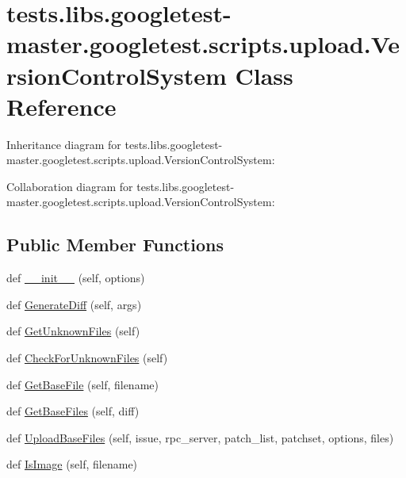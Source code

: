 \hypertarget{classtests_1_1libs_1_1googletest-master_1_1googletest_1_1scripts_1_1upload_1_1VersionControlSystem}{}\section{tests.\+libs.\+googletest-\/master.googletest.\+scripts.\+upload.\+Version\+Control\+System Class Reference}
\label{classtests_1_1libs_1_1googletest-master_1_1googletest_1_1scripts_1_1upload_1_1VersionControlSystem}


Inheritance diagram for tests.\+libs.\+googletest-\/master.googletest.\+scripts.\+upload.\+Version\+Control\+System\+:


Collaboration diagram for tests.\+libs.\+googletest-\/master.googletest.\+scripts.\+upload.\+Version\+Control\+System\+:
\subsection*{Public Member Functions}
\begin{DoxyCompactItemize}
\item 
def \hyperlink{classtests_1_1libs_1_1googletest-master_1_1googletest_1_1scripts_1_1upload_1_1VersionControlSystem_a56ed5c65746d75c0612b6a8758b15e77}{\+\_\+\+\_\+init\+\_\+\+\_\+} (self, options)
\item 
def \hyperlink{classtests_1_1libs_1_1googletest-master_1_1googletest_1_1scripts_1_1upload_1_1VersionControlSystem_aa4e3c6d22a3db778decb7e42e5b00cbd}{Generate\+Diff} (self, args)
\item 
def \hyperlink{classtests_1_1libs_1_1googletest-master_1_1googletest_1_1scripts_1_1upload_1_1VersionControlSystem_a6a135ff058a08363d2d1e782d0275a27}{Get\+Unknown\+Files} (self)
\item 
def \hyperlink{classtests_1_1libs_1_1googletest-master_1_1googletest_1_1scripts_1_1upload_1_1VersionControlSystem_a17b5f494e6fd1d7b3961294021951a87}{Check\+For\+Unknown\+Files} (self)
\item 
def \hyperlink{classtests_1_1libs_1_1googletest-master_1_1googletest_1_1scripts_1_1upload_1_1VersionControlSystem_a350c3254e2b03d54539d46d4be9b1bbc}{Get\+Base\+File} (self, filename)
\item 
def \hyperlink{classtests_1_1libs_1_1googletest-master_1_1googletest_1_1scripts_1_1upload_1_1VersionControlSystem_aee9027d88705f1171626f27f907a5d4f}{Get\+Base\+Files} (self, diff)
\item 
def \hyperlink{classtests_1_1libs_1_1googletest-master_1_1googletest_1_1scripts_1_1upload_1_1VersionControlSystem_a24186661ceb0efc81000ffe0a2dcb1bf}{Upload\+Base\+Files} (self, issue, rpc\+\_\+server, patch\+\_\+list, patchset, options, files)
\item 
def \hyperlink{classtests_1_1libs_1_1googletest-master_1_1googletest_1_1scripts_1_1upload_1_1VersionControlSystem_ae57a7fa856a943900e5c8e78a897987b}{Is\+Image} (self, filename)
\end{DoxyCompactItemize}
